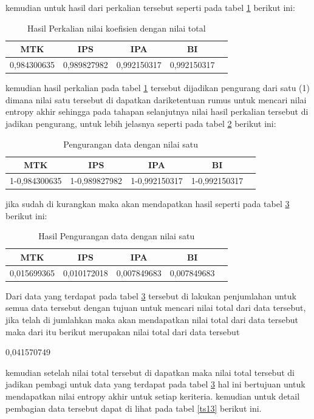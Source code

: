 kemudian untuk hasil dari perkalian tersebut seperti pada tabel \ref{ts10} berikut ini:

\begin{table}[h]
\caption{Hasil Perkalian nilai koefisien dengan nilai total}
\centering
\begin{tabular}{|c|c|c|c|c|}
\hline
 MTK & IPS & IPA&BI\\
\hline
0,984300635&0,989827982&0,992150317&0,992150317\\
\hline
\end{tabular}
\label{ts10}
\end{table}

kemudian hasil perkalian pada tabel \ref{ts10} tersebut dijadikan pengurang dari satu (1) dimana nilai satu tersebut di dapatkan dariketentuan rumus untuk mencari nilai entropy akhir sehingga pada tahapan selanjutnya nilai hasil perkalian tersebut di jadikan pengurang, untuk lebih jelasnya seperti pada tabel \ref{ts11} berikut ini:


\begin{table}[h]
\caption{Pengurangan data dengan nilai satu}
\centering
\begin{tabular}{|c|c|c|c|c|}
\hline
 MTK & IPS & IPA&BI\\
\hline
1-0,984300635&1-0,989827982&1-0,992150317&1-0,992150317\\
\hline
\end{tabular}
\label{ts11}
\end{table}
jika sudah di kurangkan maka akan mendapatkan hasil seperti pada tabel \ref{ts12} berikut ini:


\begin{table}[h]
\caption{Hasil Pengurangan data dengan nilai satu}
\centering
\begin{tabular}{|c|c|c|c|c|}
\hline
 MTK & IPS & IPA&BI\\
\hline
0,015699365&0,010172018&0,007849683&0,007849683\\
\hline
\end{tabular}
\label{ts12}
\end{table}
\pagebreak
Dari data yang terdapat pada tabel \ref{ts12} tersebut di lakukan penjumlahan untuk semua data tersebut dengan tujuan untuk mencari nilai total dari data tersebut, jika telah di jumlahkan maka akan mendapatkan nilai total dari data tersebut maka dari itu berikut merupakan nilai total dari data tersebut\par

0,041570749

kemudian setelah nilai total tersebut di dapatkan maka nilai total tersebut di jadikan pembagi untuk data yang terdapat pada tabel \ref{ts12} hal ini bertujuan untuk mendapatkan nilai entropy akhir untuk setiap keriteria. kemudian untuk detail pembagian data tersebut dapat di lihat pada tabel \ref{ts13} berikut ini.

